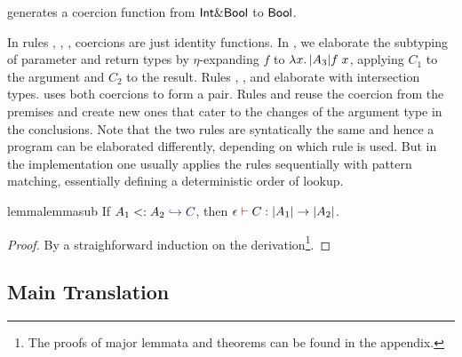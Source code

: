 \noindent generates a coercion function from $\textsf{Int} \& \textsf{Bool}$ to $\textsf{Bool}$.

In rules , , ,
coercions are just identity functions. In , we elaborate the
subtyping of parameter and return types by $\eta$-expanding $f$ to
$\lambda x.\, \lvert A_3 \rvert {f \; x}$, applying $C_1$ to the argument and $C_2$ to
the result. Rules , , and
 elaborate with intersection types.  uses
both coercions to form a pair. Rules  and
 reuse the coercion from the premises and create new ones
that cater to the changes of the argument type in the conclusions. Note that the
two rules are syntatically the same and hence a program can be elaborated
differently, depending on which rule is used. But in the implementation one
usually applies the rules sequentially with pattern matching, essentially
defining a deterministic order of lookup.
\begin{comment}
if we know $A_1$ is a subtype of $A_3$ and $C$ is a coercion from $A_1$
to $A_3$, then we can conclude that $A_1 \inter A_2$ is also a subtype
of $A_3$ and the new coercion is a function that takes a value $ x $ of type
$A_1\inter A_2$, project $x$ on the first item, and apply $ C $ to it.
\end{comment}

\begin{restatable}{lemma}{lemmasub}
  \label{lemma:sub}
  If $ A_1 \subtype A_2 \yields C $, then $ \judgeTarget \epsilon C {\im {A_1} \to \im {A_2}} $.
\end{restatable}

\begin{proof}
  By a straighforward induction on the derivation\footnote{The proofs of major lemmata and theorems can be found in the appendix.}.
\end{proof}

\subsection{Main Translation}

\begin{comment}
In this subsection we now present formally the translation rules that convert
\name terms into System $ F $ ones. This set of rules essentially extends
those in the previous section with the light-blue part for the translation.
\end{comment}


